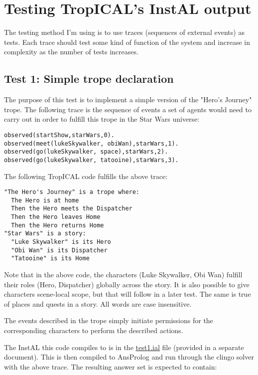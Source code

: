 \documentclass[11pt]{article}
\date{\today}
\title{}
\begin{document}
\tableofcontents

\section{Testing TropICAL's InstAL output}
\label{sec:orgheadline9}
The testing method I'm using is to use traces (sequences of external events) as tests. Each trace should test some kind of function of the system and increase in complexity as the number of tests increases.

\subsection{Test 1: Simple trope declaration}
\label{sec:orgheadline2}
The purpose of this test is to implement a simple version of the "Hero's Journey" trope. The following trace is the sequence of events a set of agents would need to carry out in order to fulfill this trope in the Star Wars universe:

\begin{verbatim}
observed(startShow,starWars,0).
observed(meet(lukeSkywalker, obiWan),starWars,1).
observed(go(lukeSkywalker, space),starWars,2).
observed(go(lukeSkywalker, tatooine),starWars,3).
\end{verbatim}

The following TropICAL code fulfills the above trace:

\begin{verbatim}
"The Hero's Journey" is a trope where:
  The Hero is at home
  Then the Hero meets the Dispatcher
  Then the Hero leaves Home
  Then the Hero returns Home
"Star Wars" is a story:
  "Luke Skywalker" is its Hero
  "Obi Wan" is its Dispatcher
  "Tatooine" is its Home
\end{verbatim}

Note that in the above code, the characters (Luke Skywalker, Obi Wan) fulfill their roles (Hero, Dispatcher) globally across the story. It is also possible to give characters scene-local scope, but that will follow in a later test. The same is true of places and quests in a story. All words are case insensitive.

The events described in the trope simply initiate permissions for the corresponding characters to perform the described actions.

The InstAL this code compiles to is in the \href{file://c:/Users/Matthew/Dropbox/clojure/tropic/resources/test1.ial}{test1.ial} file (provided in a separate document). This is then compiled to AnsProlog and run through the clingo solver with the above trace. The resulting answer set is expected to contain:
\end{document}
